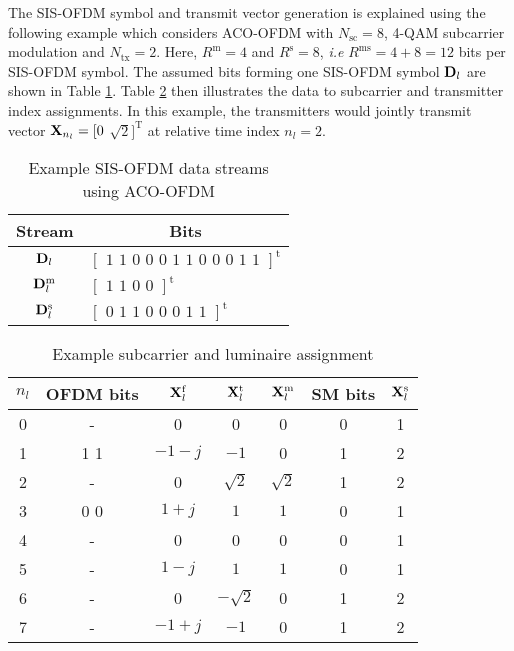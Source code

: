 The SIS-OFDM symbol and transmit vector generation is explained using the following example which considers ACO-OFDM with $N_{\text{sc}}=8$, 4-QAM subcarrier modulation and $N_{\text{tx}}=2$. Here, $R^{\text{m}}=4$ and $R^{\text{s}}=8$, \textit{i.e} $R^{\text{ms}}=4+8=12$ bits per SIS-OFDM symbol. The assumed bits forming one SIS-OFDM symbol ${\bf{D}}_l$ are shown in Table \ref{tabExBits}. Table \ref{tabExample} then illustrates the data to subcarrier and transmitter index assignments. In this example, the transmitters would jointly transmit vector ${\bf{X}}_{n_l}=[0$ $\sqrt{2}]^{\text{T}}$ at relative time index $n_l=2$.
\begin{table}[!t]
	\centering
		\begin{tabular}{|c|l|}
			\hline
			{\bf{Stream}}&\multicolumn{1}{|c|}{\bf{Bits}}\\
			\hline
			${\bf{D}}_l$ & $\left[\text{ 1 1 0 0 0 1 1 0 0 0 1 1 }\right]^{\text{t}} $\\
			\hline
			${\bf{D}}_l^{\text{m}}$ & $\left[\text{ 1 1 0 0 }\right]^{\text{t}} $\\
			\hline
			${\bf{D}}_l^{\text{s}}$ & $\left[\text{ 0 1 1 0 0 0 1 1 }\right]^{\text{t}} $\\
			\hline
		\end{tabular}
	\caption{Example SIS-OFDM data streams using ACO-OFDM}
	\label{tabExBits}
\end{table}

\begin{table}[!t]
	\centering
      \begin{tabular}{|c|c|c|c|c|c|c|}
			\hline
			{ $n_l$ }&{\bf{OFDM bits}}&${\bf{X}}_l^{\text{f}}$&${\bf{X}}^{\text{t}}_l$&${\bf{X}}^{\text{m}}_l$&{\bf{SM bits}}&${\bf{X}}^{\text{s}}_l$\\
			\hline
			0 & - & 0 & 0 & 0 &0 & 1\\
			\hline
			1 & 1 1 & $-1-j$ & $-1$ & 0 &1 & 2\\
			\hline
			2 & - & 0 & $\sqrt{2}$ & $\sqrt{2}$ &1 & 2\\
			\hline
			3 & 0 0 & $1+j$ & $1$ & $1$ & 0& 1\\
			\hline
			4 &-& 0 & 0 & 0 &0 & 1\\
			\hline
			5 &-& $1-j$ & $1$ & $1$ &0 & 1\\
			\hline
			6 &-& 0 & $-\sqrt{2}$ & 0 & 1& 2\\
			\hline
			7 &-& $-1+j$ & $-1$ & 0 &1 & 2\\
			\hline
		\end{tabular}
	\caption{Example subcarrier and luminaire assignment}
	\label{tabExample}
\end{table}

